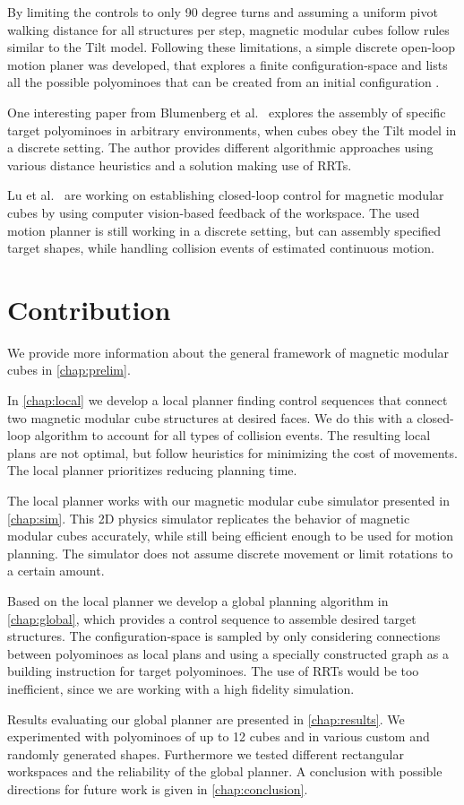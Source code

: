 By limiting the controls to only 90 degree turns and assuming a uniform pivot walking distance for all structures per step, magnetic modular cubes follow rules similar to the Tilt model.
Following these limitations, a simple discrete open-loop motion planer was developed, that explores a finite configuration-space and lists all the possible polyominoes that can be created from an initial configuration \cite{Bhattacharjee2022}.

One interesting paper from Blumenberg et al.\ \cite{blumenberg2023} explores the assembly of specific target polyominoes in arbitrary environments, when cubes obey the Tilt model in a discrete setting.
The author provides different algorithmic approaches using various distance heuristics and a solution making use of RRTs.

Lu et al.\ \cite{Lu2023} are working on establishing closed-loop control for magnetic modular cubes by using computer vision-based feedback of the workspace.
The used motion planner is still working in a discrete setting, but can assembly specified target shapes, while handling collision events of estimated continuous motion.

\newpage

\section{Contribution}

We provide more information about the general framework of magnetic modular cubes in \autoref{chap:prelim}.

In \autoref{chap:local} we develop a local planner finding control sequences that connect two magnetic modular cube structures at desired faces.
We do this with a closed-loop algorithm to account for all types of collision events.
The resulting local plans are not optimal, but follow heuristics for minimizing the cost of movements.
The local planner prioritizes reducing planning time. 

The local planner works with our magnetic modular cube simulator presented in \autoref{chap:sim}.
This 2D physics simulator replicates the behavior of magnetic modular cubes accurately, while still being efficient enough to be used for motion planning.
The simulator does not assume discrete movement or limit rotations to a certain amount.

Based on the local planner we develop a global planning algorithm in \autoref{chap:global}, which provides a control sequence to assemble desired target structures.
The configuration-space is sampled by only considering connections between polyominoes as local plans and using a specially constructed graph as a building instruction for target polyominoes.
The use of RRTs would be too inefficient, since we are working with a high fidelity simulation. 

Results evaluating our global planner are presented in \autoref{chap:results}.
We experimented with polyominoes of up to 12 cubes and in various custom and randomly generated shapes.
Furthermore we tested different rectangular workspaces and the reliability of the global planner.  
A conclusion with possible directions for future work is given in \autoref{chap:conclusion}.